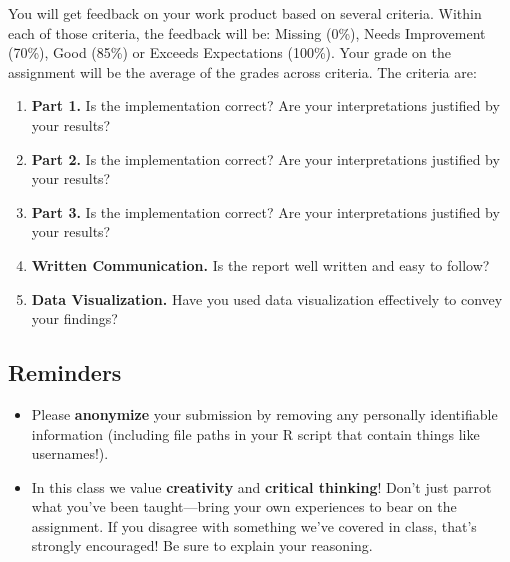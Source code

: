 \documentclass{article}
\begin{document}
      You will get feedback on your work product based on several criteria. Within each of those criteria, the feedback will be: Missing (0\%), Needs Improvement (70\%), Good (85\%) or Exceeds Expectations (100\%). Your grade on the assignment will be the average of the grades across criteria. The criteria are:
      \begin{enumerate}
        \item {\bf Part 1.} Is the implementation correct? Are your interpretations justified by your results?
        \item {\bf Part 2.} Is the implementation correct? Are your interpretations justified by your results?
        \item {\bf Part 3.} Is the implementation correct? Are your interpretations justified by your results?
        \item {\bf Written Communication.} Is the report well written and easy to follow?
        \item {\bf Data Visualization.} Have you used data visualization effectively to convey your findings?
      \end{enumerate}

    \subsection*{\sc Reminders}

      \begin{itemize}
        \item Please {\bf anonymize} your submission by removing any personally identifiable information (including file paths in your R script that contain things like usernames!).
        \item In this class we value {\bf creativity} and {\bf critical thinking}! Don't just parrot what you've been taught---bring your own experiences to bear on the assignment. If you disagree with something we've covered in class, that's strongly encouraged! Be sure to explain your reasoning.
      \end{itemize}
\end{document}
